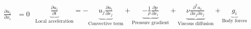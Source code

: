 \pagebreak
\begin{subequations} 

    \begin{equation}
    \begin{aligned}
    \frac{\partial u_i}{\partial x_i} &= 0
    \end{aligned}
    \end{equation}

    \begin{equation}
    \begin{aligned}
   \underbrace{ \frac{\partial u_i}{\partial t} }_{\text{Local acceleration}}
= 
- 
\underbrace{ u_j \frac{\partial u_i}{\partial x_j} }_{\text{Convective term}} 
+
\underbrace{ -\frac{1}{\rho} \frac{\partial p}{\partial x_i} }_{\text{Pressure gradient}}
+ 
\underbrace{ \nu \frac{\partial^2 u_i}{\partial x_j \partial x_j} }_{\text{Viscous diffusion}}
+ 
\underbrace{ g_i }_{\text{Body forces}}
    \end{aligned}
    \end{equation}
\end{subequations}